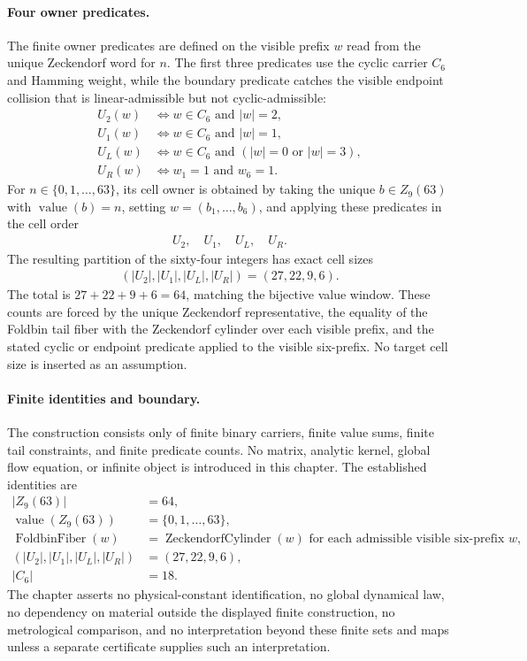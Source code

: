 \paragraph{Four owner predicates.}
The finite owner predicates are defined on the visible prefix $w$ read from the unique Zeckendorf word for $n$. The first three predicates use the cyclic carrier $C_6$ and Hamming weight, while the boundary predicate catches the visible endpoint collision that is linear-admissible but not cyclic-admissible:
$$
\begin{aligned}
U_2(w)&\Longleftrightarrow w\in C_6 \text{ and } |w|=2,\\
U_1(w)&\Longleftrightarrow w\in C_6 \text{ and } |w|=1,\\
U_L(w)&\Longleftrightarrow w\in C_6 \text{ and } (|w|=0 \text{ or } |w|=3),\\
U_R(w)&\Longleftrightarrow w_1=1 \text{ and } w_6=1.
\end{aligned}
$$
For $n\in\{0,1,\ldots,63\}$, its cell owner is obtained by taking the unique $b\in Z_9(63)$ with $\operatorname{value}(b)=n$, setting $w=(b_1,\ldots,b_6)$, and applying these predicates in the cell order
$$
\begin{aligned}
U_2,\quad U_1,\quad U_L,\quad U_R.
\end{aligned}
$$
The resulting partition of the sixty-four integers has exact cell sizes
$$
\begin{aligned}
(|U_2|,|U_1|,|U_L|,|U_R|)=(27,22,9,6).
\end{aligned}
$$
The total is $27+22+9+6=64$, matching the bijective value window. These counts are forced by the unique Zeckendorf representative, the equality of the Foldbin tail fiber with the Zeckendorf cylinder over each visible prefix, and the stated cyclic or endpoint predicate applied to the visible six-prefix. No target cell size is inserted as an assumption.

\paragraph{Finite identities and boundary.}
The construction consists only of finite binary carriers, finite value sums, finite tail constraints, and finite predicate counts. No matrix, analytic kernel, global flow equation, or infinite object is introduced in this chapter. The established identities are
$$
\begin{aligned}
|Z_9(63)|&=64,\\
\operatorname{value}(Z_9(63))&=\{0,1,\ldots,63\},\\
\operatorname{FoldbinFiber}(w)&=\operatorname{ZeckendorfCylinder}(w) \text{ for each admissible visible six-prefix } w,\\
(|U_2|,|U_1|,|U_L|,|U_R|)&=(27,22,9,6),\\
|C_6|&=18.
\end{aligned}
$$
The chapter asserts no physical-constant identification, no global dynamical law, no dependency on material outside the displayed finite construction, no metrological comparison, and no interpretation beyond these finite sets and maps unless a separate certificate supplies such an interpretation.
